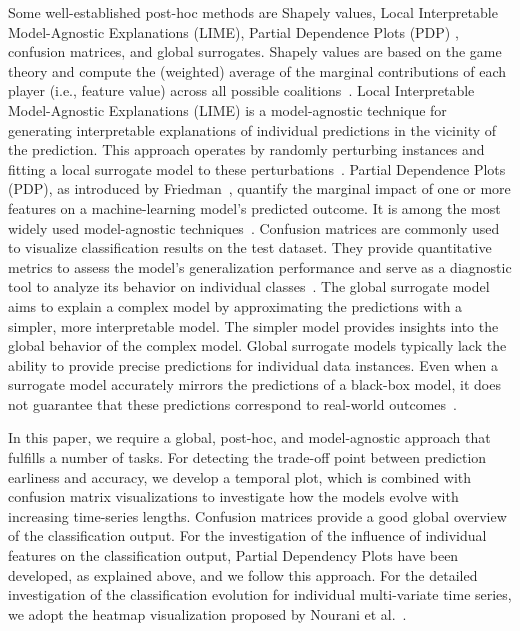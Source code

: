 Some well-established post-hoc methods are Shapely values, Local Interpretable Model-Agnostic Explanations (LIME), Partial Dependence Plots (PDP) , confusion matrices, and global surrogates.
Shapely values are based on the game theory and compute the (weighted) average of the marginal contributions of each player (i.e., feature value) across all possible coalitions~\cite{abusitta2024survey}. 
Local Interpretable Model-Agnostic Explanations (LIME) is a model-agnostic technique for generating interpretable explanations of individual predictions in the vicinity of the prediction. This approach operates by randomly perturbing instances and fitting a local surrogate model to these perturbations~\cite{kamath2021explainable}.
Partial Dependence Plots (PDP), as introduced by Friedman~\cite{friedman2001greedy}, quantify the marginal impact of one or more features on a machine-learning model's predicted outcome. It is among the most widely used model-agnostic techniques~\cite{angelini2023visual}.
Confusion matrices are commonly used to visualize classification results on the test dataset. They provide quantitative metrics to assess the model's generalization performance and serve as a diagnostic tool to analyze its behavior on individual classes~\cite{kamath2021explainable}.
The global surrogate model aims to explain a complex model by approximating the predictions with a simpler, more interpretable model. The simpler model provides insights into the global behavior of the complex model. Global surrogate models typically lack the ability to provide precise predictions for individual data instances. Even when a surrogate model accurately mirrors the predictions of a black-box model, it does not guarantee that these predictions correspond to real-world outcomes~\cite{kamath2021explainable}.

In this paper, we require a global, post-hoc, and model-agnostic approach that fulfills a number of tasks. For detecting the trade-off point between prediction earliness and accuracy, we develop a temporal plot, which is combined with confusion matrix visualizations to investigate how the models evolve with increasing time-series lengths. Confusion matrices provide a good global overview of the classification output. For the investigation of the influence of individual features on the classification output, Partial Dependency Plots have been developed, as explained above, and we follow this approach. For the detailed investigation of the classification evolution for individual multi-variate time series, we adopt the heatmap visualization proposed by Nourani et al.~\cite{nourani2022detoxer}.
